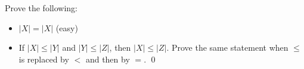   Prove the following:
  \begin{itemize}
  \item $|X| = |X|$ (easy)
  \item
  If $|X| \leq |Y|$ and $|Y| \leq |Z|$, then $|X| \leq |Z|$.
  Prove the same statement when $\leq$ is replaced by $<$ and then by
  $=$.
  \qed
  \end{itemize}

